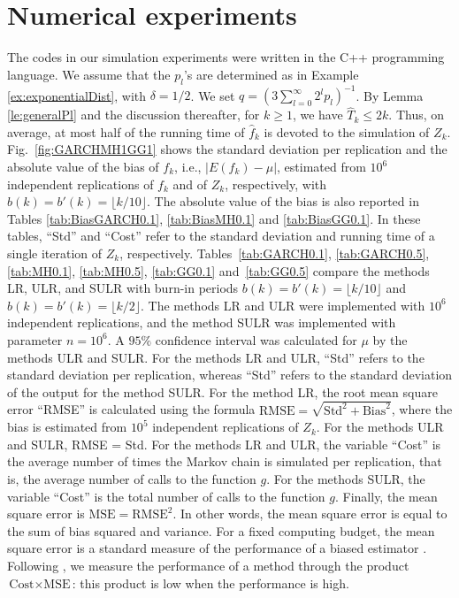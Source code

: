 \documentclass[a4paper,11pt]{article}
\begin{document}
\section{Numerical experiments}\label{se:NumerExper}
The codes in our simulation experiments were written in the C++ programming language. We assume that the \(p_{l}\)'s are determined as in Example \ref{ex:exponentialDist}, with \(\delta=1/2\). We set \(q=(3\sum^{\infty}_{l=0}2^{l}p_{l})^{-1}\).
By Lemma \ref{le:generalPl} and the discussion thereafter, for \(k\ge1\), we have \(\hat T_{k}\leq 2k\). Thus, on average, at most half of the running time of \(\hat f_{k}\) is devoted to the simulation of \(Z_{k}\).  Fig.~\ref{fig:GARCHMH1GG1} shows the standard deviation per replication and the absolute value of the bias of \(f_{k}\), i.e.,  \(|E(f_{k})-\mu|\),   estimated from \(10^{6}\) independent replications of \(f_{k}\) and of \(Z_{k}\), respectively, with   \(b(k)=b'(k)=\lfloor k/10\rfloor\). The absolute value of the bias is also reported in Tables \ref{tab:BiasGARCH0.1}, \ref{tab:BiasMH0.1} and \ref{tab:BiasGG0.1}. In these tables, ``Std'' and ``Cost'' refer to the standard deviation and running time of a single iteration of \(Z_{k}\), respectively.   Tables~\ref{tab:GARCH0.1}, \ref{tab:GARCH0.5}, \ref{tab:MH0.1}, \ref{tab:MH0.5}, \ref{tab:GG0.1} and~\ref{tab:GG0.5} compare the methods LR, ULR, and SULR with burn-in periods  \(b(k)=b'(k)=\lfloor k/10\rfloor\) and   \(b(k)=b'(k)=\lfloor k/2\rfloor\).  The methods LR and ULR were implemented with \(10^{6}\) independent replications, and the  method SULR was implemented with  parameter \(n=10^{6}\). A \(95\%\) confidence interval was calculated for \(\mu\) by the methods ULR and SULR. For the methods LR and ULR,   ``Std'' refers to  the standard deviation per replication, whereas   ``Std'' refers to the standard deviation of the output for the method SULR. For the method LR, the root mean square error ``RMSE'' is calculated using the formula \(\text{RMSE}=\sqrt{\text{Std}^{2}+\text{Bias}^{2}}\), where the  bias is estimated from \(10^{5}\) independent replications of \(Z_{k}\).   For the methods ULR and SULR,  RMSE = Std. For the methods LR and ULR, the variable ``Cost'' is the average number of times the Markov chain is simulated per replication, that is, the average number of calls to the function \(g\). For the methods SULR, the variable ``Cost'' is the total number  of calls to the function \(g\). Finally, the mean square error is \(\text{MSE}=\text{RMSE}^2\). In other words, the mean square error is equal to the sum of bias squared and variance. For a fixed computing budget, the mean square error is a standard measure of the performance of a biased estimator \cite{glasserman2004Monte}. Following \cite{GlynnRhee2015unbiased}, we measure the performance of a method through the product \(\text{Cost}\times\text{MSE}\): this product is low when the performance is high.
\end{document}
